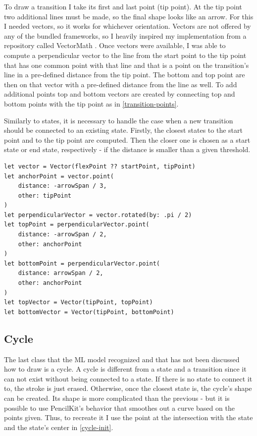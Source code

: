 To draw a transition I take its first and last point (tip point). At the tip point two additional lines must be made, so the final shape looks like an arrow. For this I needed vectors, so it works for whichever orientation. Vectors are not offered by any of the bundled frameworks, so I heavily inspired my implementation from a repository called VectorMath \cite{vectormath}. Once vectors were available, I was able to compute a perpendicular vector to the line from the start point to the tip point that has one common point with that line and that is a point on the transition's line in a pre-defined distance from the tip point. The bottom and top point are then on that vector with a pre-defined distance from the line as well. To add additional points top and bottom vectors are created by connecting top and bottom points with the tip point as in \ref{transition-points}.

Similarly to states, it is necessary to handle the case when a new transition should be connected to an existing state. Firstly, the closest states to the start point and to the tip point are computed. Then the closer one is chosen as a start state or end state, respectively - if the distance is smaller than a given threshold.

\begin{lstlisting}[caption={Computation of top and bottom points, vectors}, label=transition-points]
let vector = Vector(flexPoint ?? startPoint, tipPoint)
let anchorPoint = vector.point(
    distance: -arrowSpan / 3, 
    other: tipPoint
)
let perpendicularVector = vector.rotated(by: .pi / 2)
let topPoint = perpendicularVector.point(
    distance: -arrowSpan / 2,
    other: anchorPoint
)
let bottomPoint = perpendicularVector.point(
    distance: arrowSpan / 2,
    other: anchorPoint
)
let topVector = Vector(tipPoint, topPoint)
let bottomVector = Vector(tipPoint, bottomPoint)
\end{lstlisting}

\subsection{Cycle}

The last class that the ML model recognized and that has not been discussed how to draw is a cycle. A cycle is different from a state and a transition since it can not exist without being connected to a state. If there is no state to connect it to, the stroke is just erased. Otherwise, once the closest state is, the cycle's shape can be created. Its shape is more complicated than the previous - but it is possible to use PencilKit's behavior that smoothes out a curve based on the points given. Thus, to recreate it I use the point at the intersection with the state and the state's center in \ref{cycle-init}.


